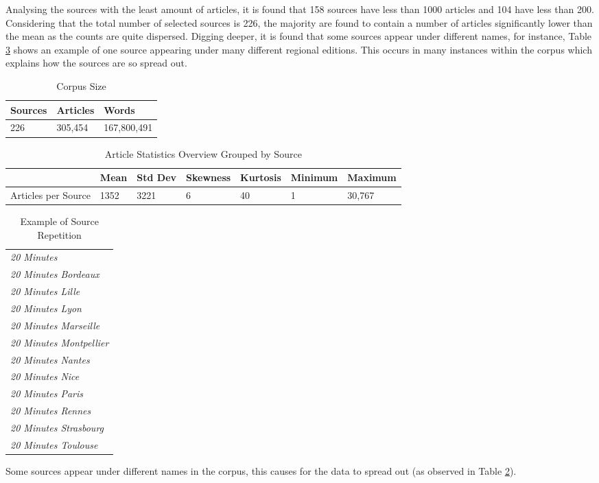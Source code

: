 Analysing the sources with the least amount of articles, it is found that 158 sources have less than 1000 articles and 104 have less than 200. Considering that the total number of selected sources is 226, the majority are found to contain a number of articles significantly lower than the mean as the counts are quite dispersed. Digging deeper, it is found that some sources appear under different names, for instance, Table \ref{tab:source repetition} shows an example of one source appearing under many different regional editions. This occurs in many instances within the corpus which explains how the sources are so spread out. 

\begin{table}[H]
\centering
\begin{tabular}{lll}
\toprule
Sources & Articles & Words \\ \hline
226 & 305,454 & 167,800,491 \\
\bottomrule
\end{tabular}
\caption{Corpus Size}
\label{tab: corpus size}
\end{table}

\begin{table}[H]
\centering
\begin{tabular}{@{}lllllll@{}}
\toprule
 & Mean & Std Dev & Skewness & Kurtosis & Minimum & Maximum \\ \midrule
Articles per Source & 1352 & 3221 & 6 & 40 & 1 & 30,767 \\ \bottomrule
\end{tabular}
\caption{Article Statistics Overview Grouped by Source}
\label{tab:core stat source}
\end{table}

\begin{table}[H]
\centering
\begin{tabular}{l}
\toprule
\emph{20 Minutes} \\
\emph{20 Minutes Bordeaux} \\
\emph{20 Minutes Lille} \\
\emph{20 Minutes Lyon} \\
\emph{20 Minutes Marseille} \\
\emph{20 Minutes Montpellier} \\
\emph{20 Minutes Nantes} \\
\emph{20 Minutes Nice} \\
\emph{20 Minutes Paris} \\
\emph{20 Minutes Rennes} \\
\emph{20 Minutes Strasbourg} \\
\emph{20 Minutes Toulouse} \\
\bottomrule
\end{tabular}
\caption{Example of Source Repetition}
\label{tab:source repetition}
Some sources appear under different names in the corpus, this causes for the data to spread out (as observed in Table \ref{tab:core stat source}).
\end{table}

